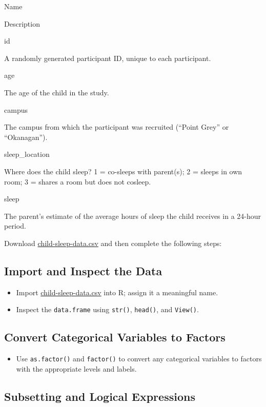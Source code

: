 \documentclass[
]{book}
\providecommand{\tightlist}{%
  \setlength{\itemsep}{0pt}\setlength{\parskip}{0pt}}
\begin{document}
Name

Description

id

A randomly generated participant ID, unique to each participant.

age

The age of the child in the study.

campus

The campus from which the participant was recruited (``Point Grey'' or ``Okanagan'').

sleep\_location

Where does the child sleep? 1 = co-sleeps with parent(s); 2 = sleeps in own room; 3 = shares a room but does not cosleep.

sleep

The parent's estimate of the average hours of sleep the child receives in a 24-hour period.

Download \href{../assets/documents/child-sleep-data.csv}{child-sleep-data.csv} and then complete the following steps:

\hypertarget{import-and-inspect-the-data}{%
\subsection{Import and Inspect the Data}\label{import-and-inspect-the-data}}

\begin{itemize}
\tightlist
\item
  Import \href{../assets/documents/child-sleep-data.csv}{child-sleep-data.csv} into R; assign it a meaningful name.
\item
  Inspect the \texttt{data.frame} using \texttt{str()}, \texttt{head()}, and \texttt{View()}.
\end{itemize}

\hypertarget{convert-categorical-variables-to-factors}{%
\subsection{Convert Categorical Variables to Factors}\label{convert-categorical-variables-to-factors}}

\begin{itemize}
\tightlist
\item
  Use \texttt{as.factor()} and \texttt{factor()} to convert any categorical variables to factors with the appropriate levels and labels.
\end{itemize}

\hypertarget{subsetting-and-logical-expressions}{%
\subsection{Subsetting and Logical Expressions}\label{subsetting-and-logical-expressions}}
\end{document}
